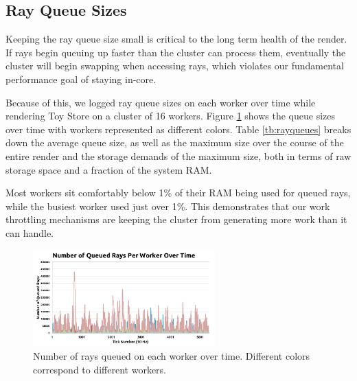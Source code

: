 \documentclass[a4paper,twoside]{article}
\begin{document}
\subsection{Ray Queue Sizes}
\label{queuesizes}

Keeping the ray queue size small is critical to the long term health of the
render. If rays begin queuing up faster than the cluster can process them,
eventually the cluster will begin swapping when accessing rays, which violates
our fundamental performance goal of staying in-core.

Because of this, we logged ray queue sizes on each worker over time while
rendering Toy Store on a cluster of 16 workers. Figure \ref{fig:queuesize}
shows the queue sizes over time with workers represented as different colors.
Table \ref{tb:rayqueues} breaks down the average queue size, as well as the
maximum size over the course of the entire render and the storage demands of the
maximum size, both in terms of raw storage space and a fraction of the system
RAM.

Most workers sit comfortably below 1\% of their RAM being used for queued rays,
while the busiest worker used just over 1\%. This demonstrates that our work
throttling mechanisms are keeping the cluster from generating more work than it
can handle.

\begin{figure}[h!]
    \centering
    \includegraphics[width=70mm]{figures/queuesize.png}
    \caption{Number of rays queued on each worker over time. Different colors correspond to different workers.}
    \label{fig:queuesize}
\end{figure}
\end{document}
